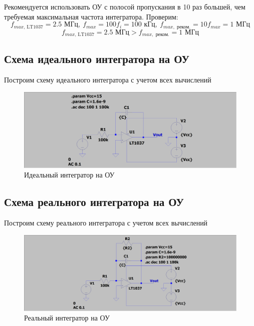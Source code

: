 \documentclass[a4paper, 12pt]{article}
\begin{document}
    
    Рекомендуется использовать ОУ с полосой пропускания в 10 раз большей, чем требуемая максимальная
    частота интегратора. Проверим:
    $$
    f_{max,\,\text{LT1037}}=2.5\text{ МГц},\ f_{max}=100f_i=100\text{ кГц},\ f_{max,\text{ реком.}}=10f_{max}=1\text{ МГц}
    $$
    $$
    f_{max,\,\text{LT1037}}=2.5\text{ МГц}>f_{max,\text{ реком.}}=1\text{ МГц}
    $$


    \subsection{Схема идеального интегратора на ОУ}
    Построим схему идеального интегратора с учетом всех вычислений
    \begin{figure}[H]
        \centering
        \includegraphics[scale=0.22]{scheme6.png}
        \captionsetup{skip=0pt}
        \caption{Идеальный интегратор на ОУ}
        \label{fig:scheme6}
    \end{figure}


    \subsection{Схема реального интегратора на ОУ}
    Построим схему реального интегратора с учетом всех вычислений
    \begin{figure}[H]
        \centering
        \includegraphics[scale=0.22]{scheme7.png}
        \captionsetup{skip=0pt}
        \caption{Реальный интегратор на ОУ}
        \label{fig:scheme7}
    \end{figure}
\end{document}
